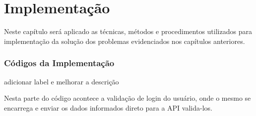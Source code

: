 \chapter{Implementação }
Neste capítulo será aplicado as técnicas, métodos e procedimentos utilizados para implementação da solução dos problemas evidenciados nos capítulos anteriores.
\subsection{Códigos da Implementação}

{\color{red} adicionar label e melhorar a descrição}

Nesta parte do código acontece a validação de login do usuário, onde o mesmo se encarrega e enviar os dados informados direto para a API valida-los.
\begin{figure}[H]
	

\centering
\mbox{%
}	
	
	
\end{figure}
\newpage

